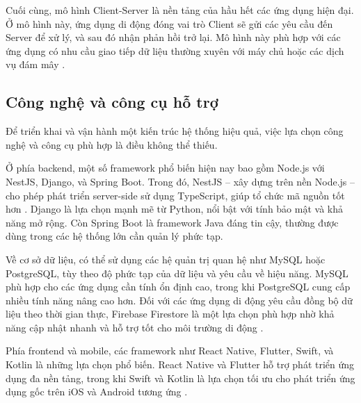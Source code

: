       \begin{flushleft}
        \hspace*{0.8cm}Cuối cùng, mô hình Client-Server là nền tảng của hầu hết các ứng dụng hiện đại. Ở mô hình này, ứng dụng di động đóng vai trò Client sẽ gửi các yêu cầu đến Server để xử lý, và sau đó nhận phản hồi trở lại. Mô hình này phù hợp với các ứng dụng có nhu cầu giao tiếp dữ liệu thường xuyên với máy chủ hoặc các dịch vụ đám mây \cite{backendframeworks}.
      \end{flushleft}

    \subsection{Công nghệ và công cụ hỗ trợ}
    \renewcommand{\labelitemi}{--}
    \begin{flushleft}
        \hspace*{0.8cm}Để triển khai và vận hành một kiến trúc hệ thống hiệu quả, việc lựa chọn công nghệ và công cụ phù hợp là điều không thể thiếu.
      \end{flushleft}

      \begin{flushleft}
        \hspace*{0.8cm}Ở phía backend, một số framework phổ biến hiện nay bao gồm Node.js với NestJS, Django, và Spring Boot. Trong đó, NestJS – xây dựng trên nền Node.js – cho phép phát triển server-side sử dụng TypeScript, giúp tổ chức mã nguồn tốt hơn \cite{backendframeworks}. Django là lựa chọn mạnh mẽ từ Python, nổi bật với tính bảo mật và khả năng mở rộng. Còn Spring Boot là framework Java đáng tin cậy, thường được dùng trong các hệ thống lớn cần quản lý phức tạp.
      \end{flushleft}

      \begin{flushleft}
        \hspace*{0.8cm}Về cơ sở dữ liệu, có thể sử dụng các hệ quản trị quan hệ như MySQL hoặc PostgreSQL, tùy theo độ phức tạp của dữ liệu và yêu cầu về hiệu năng. MySQL phù hợp cho các ứng dụng cần tính ổn định cao, trong khi PostgreSQL cung cấp nhiều tính năng nâng cao hơn. Đối với các ứng dụng di động yêu cầu đồng bộ dữ liệu theo thời gian thực, Firebase Firestore là một lựa chọn phù hợp nhờ khả năng cập nhật nhanh và hỗ trợ tốt cho môi trường di động \cite{database}.
      \end{flushleft}

      \begin{flushleft}
        \hspace*{0.8cm}Phía frontend và mobile, các framework như React Native, Flutter, Swift, và Kotlin là những lựa chọn phổ biến. React Native và Flutter hỗ trợ phát triển ứng dụng đa nền tảng, trong khi Swift và Kotlin là lựa chọn tối ưu cho phát triển ứng dụng gốc trên iOS và Android tương ứng \cite{mobileframeworks}.
      \end{flushleft}

